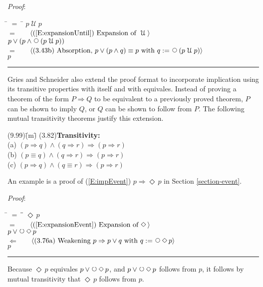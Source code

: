 \documentclass[12pt, fleqn, leqno]{article}
\newcommand{\lgap}{2pt}                             %
\newcommand{\mymathindent}{24pt}                    %
\newcommand{\impl}{\ensuremath{\Rightarrow}}        %
\newcommand{\foll}{\ensuremath{\Leftarrow}}         %
\newcommand{\Until}{\;\mathcal{U}\;}
\newcommand{\Next}{\;\,\text{\raisebox{3.5pt}{\circle{6}}}}
\newcommand{\Event}{\Diamond\,}
\newcommand{\myqed}{\rule[-.23ex]{1.2ex}{2.0ex}}
\newcommand{\myqedtab}{\hspace{384pt}}              %
\newcommand{\Gll} {\langle}                         %
\newcommand{\Ggg} {\rangle}                         %
\newcommand{\Hint}[1]     {\ \ \ $\Gll              \mbox{#1} \Ggg$ }   %
\begin{document}
\emph{Proof}:
\begin{tabbing}
\hspace{\mymathindent} \= $= \;$ \= \kill
  \> \>   $p \Until p$\\[\lgap]
  \> $=$  \>  \Hint{(\ref{E:expansionUntil}) Expansion of $\Until$}\\[\lgap]
  \> \>   $p \lor (p \land \Next(p \Until p))$\\[\lgap]
  \> $=$  \>  \Hint{(3.43b) Absorption, $p \lor (p \land q) \equiv p$ with $q := \Next (p \Until p)$}\\[\lgap]
  \> \>   $p$ \quad \myqed
\end{tabbing}

Gries and Schneider also extend the proof format to incorporate implication using its transitive properties
with itself and with equivales.
Instead of proving a theorem of the form $P\impl Q$ to be equivalent to a previously proved theorem,
$P$ can be shown to imply $Q$, or $Q$ can be shown to follow from $P$.
The following mutual transitivity theorems justify this extension.
\begin{tabbing}
(9.99)\;\=(m)\;\=\kill
(3.82)\>\textbf{Transitivity:}\\
      \> (a)\> $(p\impl q) \land (q\impl r) \impl (p\impl r)$\\[\lgap]
      \> (b)\> $(p\equiv q) \land (q\impl r) \impl (p\impl r)$\\[\lgap]
      \> (c)\> $(p\impl q) \land (q\equiv r) \impl (p\impl r)$
\end{tabbing}
An example is a proof of (\ref{E:impEvent}) $p \impl \Event p$ in Section \ref{section-event}.

\emph{Proof}:
\begin{tabbing}
\hspace{\mymathindent} \= $= \;$ \= \myqedtab \= \kill
  \> \>   $\Event p$\\[\lgap]
  \> $=$  \>  \Hint{(\ref{E:expansionEvent}) Expansion of $\Event$}\\[\lgap]
  \> \>   $p \lor \Next\Event p$\\[\lgap]
  \> $\foll$  \>  \Hint{(3.76a) Weakening $p\impl p\lor q$ with $q:=\Next\Event p$}\\[\lgap]
  \> \>   $p$ \quad \myqed
\end{tabbing}
Because $\Event p$ equivales $p \lor \Next\Event p$, and $p \lor \Next\Event p$ follows from $p$, it follows by
mutual transitivity that $\Event p$ follows from $p$.
\end{document}
